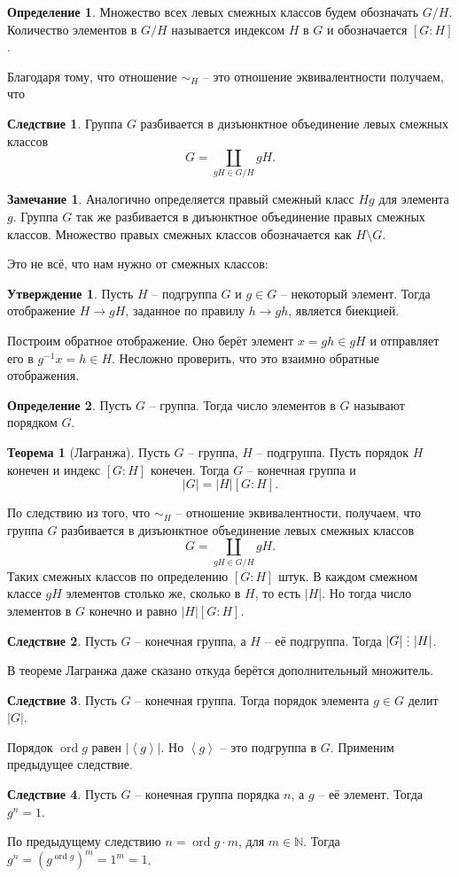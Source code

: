 \documentclass[10pt,a4paper,oneside]{book}
\theoremstyle{definition}
\newtheorem*{rem}{\color{green!50!blue}Замечание}
\newtheorem*{defn}{\color{yellow!30!red} Определение}
\newtheorem{thm}{\color{red!40!black}Теорема}
\newtheorem{cor}{\color{green!45!black}Следствие}
\newtheorem{utvr}{\color{blue!50!black}Утверждение}
\newcommand{\mb}[1]{\mathbb{#1}}
\newcommand{\ord}{\operatorname{ord}}
\newcommand{\di}{\mathop{\,\scalebox{0.85}{\raisebox{-1.2pt}[0.5\height]{\vdots}}\,}}
\def\lan{\left\langle }
\def\ran{\right\rangle}
\def\thrm{\begin{thm}}
\def\ethrm{\end{thm}}
\def\dfn{\begin{defn}}
\def\edfn{\end{defn}}
\def\crl{\begin{cor}}
\def\ecrl{\end{cor}}
\def\rm{\begin{rem}}
\def\erm{\end{rem}}
\def\utv{\begin{utvr}}
\def\eutv{\end{utvr}}
\begin{document}
\dfn Множество всех левых смежных классов будем обозначать $G/H$. Количество элементов в $G/H$ называется индексом $H$ в $G$  и обозначается $[G:H]$. 
\edfn

Благодаря тому, что отношение $\sim_H$ -- это отношение эквивалентности получаем, что



\crl Группа $G$ разбивается в дизъюнктное объединение левых смежных классов $$G=\coprod_{ gH \in G/H} gH.$$
\ecrl




\rm Аналогично определяется правый смежный класс $Hg$ для элемента $g$. Группа $G$ так же разбивается в диъюнктное объединение правых смежных классов. Множество правых смежных классов обозначается как $H\setminus G$.
\erm 

Это не всё, что нам нужно от смежных классов:

\utv Пусть $H$ -- подгруппа $G$ и $g\in G$ -- некоторый элемент. Тогда отображение $H \to gH$, заданное по правилу $h \to gh$, является биекцией.
\eutv
\proof Построим обратное отображение. Оно берёт элемент $x=gh\in gH$ и отправляет его в $g^{-1}x=h \in H $. Несложно проверить, что это взаимно обратные отображения.
\endproof

\dfn Пусть $G$ -- группа. Тогда число элементов в $G$ называют порядком $G$.
\edfn

\thrm[Лагранжа]  Пусть $G$ -- группа, $H$ -- подгруппа. Пусть порядок  $H$ конечен и индекс $[G:H]$ конечен. Тогда $G$ -- конечная группа и 
 $$|G|=|H|[G:H].$$
\ethrm
\proof По следствию из того, что $\sim_H$ -- отношение эквивалентности, получаем, что группа $G$ разбивается в дизъюнктное объединение левых смежных классов $$G=\coprod_{gH \in G/H} gH.$$
Таких смежных классов по определению $[G:H]$ штук. В каждом смежном классе $gH$ элементов столько же, сколько в $H$, то есть $|H|$. Но тогда число элементов в $G$ конечно и равно $|H|[G:H]$.
\endproof

\crl Пусть $G$ -- конечная группа, а $H$ -- её подгруппа. Тогда $|G| \di |H|$. 
\ecrl 
\proof В теореме Лагранжа даже сказано откуда берётся дополнительный множитель.
\endproof

\crl Пусть $G$ -- конечная группа. Тогда порядок элемента $g\in G$ делит $|G|$.
\ecrl
\proof Порядок $\ord g$ равен $|\lan g\ran|$. Но $\lan g\ran$ -- это подгруппа в $G$. Применим предыдущее следствие.
\endproof

\crl Пусть $G$ -- конечная группа порядка $n$, а $g$ -- её элемент. Тогда $g^n=1$.
\ecrl  
\proof По предыдущему следствию $n= \ord g \cdot m$, для $m\in \mb N$. Тогда $g^n=(g^{\ord g})^m=1^m=1$. 
\endproof
\end{document}
